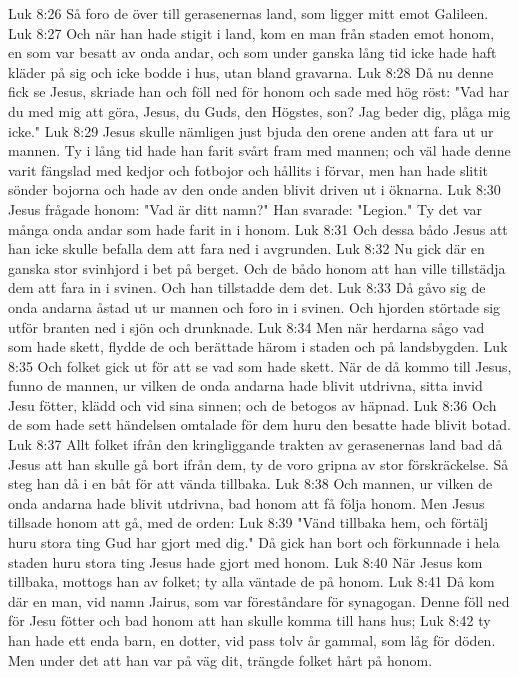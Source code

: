 Luk 8:26  Så foro de över till gerasenernas land, som ligger mitt emot Galileen.
Luk 8:27  Och när han hade stigit i land, kom en man från staden emot honom, en som var besatt av onda andar, och som under ganska lång tid icke hade haft kläder på sig och icke bodde i hus, utan bland gravarna.
Luk 8:28  Då nu denne fick se Jesus, skriade han och föll ned för honom och sade med hög röst: "Vad har du med mig att göra, Jesus, du Guds, den Högstes, son? Jag beder dig, plåga mig icke."
Luk 8:29  Jesus skulle nämligen just bjuda den orene anden att fara ut ur mannen. Ty i lång tid hade han farit svårt fram med mannen; och väl hade denne varit fängslad med kedjor och fotbojor och hållits i förvar, men han hade slitit sönder bojorna och hade av den onde anden blivit driven ut i öknarna.
Luk 8:30  Jesus frågade honom: "Vad är ditt namn?" Han svarade: "Legion." Ty det var många onda andar som hade farit in i honom.
Luk 8:31  Och dessa bådo Jesus att han icke skulle befalla dem att fara ned i avgrunden.
Luk 8:32  Nu gick där en ganska stor svinhjord i bet på berget. Och de bådo honom att han ville tillstädja dem att fara in i svinen. Och han tillstadde dem det.
Luk 8:33  Då gåvo sig de onda andarna åstad ut ur mannen och foro in i svinen. Och hjorden störtade sig utför branten ned i sjön och drunknade.
Luk 8:34  Men när herdarna sågo vad som hade skett, flydde de och berättade härom i staden och på landsbygden.
Luk 8:35  Och folket gick ut för att se vad som hade skett. När de då kommo till Jesus, funno de mannen, ur vilken de onda andarna hade blivit utdrivna, sitta invid Jesu fötter, klädd och vid sina sinnen; och de betogos av häpnad.
Luk 8:36  Och de som hade sett händelsen omtalade för dem huru den besatte hade blivit botad.
Luk 8:37  Allt folket ifrån den kringliggande trakten av gerasenernas land bad då Jesus att han skulle gå bort ifrån dem, ty de voro gripna av stor förskräckelse. Så steg han då i en båt för att vända tillbaka.
Luk 8:38  Och mannen, ur vilken de onda andarna hade blivit utdrivna, bad honom att få följa honom. Men Jesus tillsade honom att gå, med de orden:
Luk 8:39  "Vänd tillbaka hem, och förtälj huru stora ting Gud har gjort med dig." Då gick han bort och förkunnade i hela staden huru stora ting Jesus hade gjort med honom.
Luk 8:40  När Jesus kom tillbaka, mottogs han av folket; ty alla väntade de på honom.
Luk 8:41  Då kom där en man, vid namn Jairus, som var föreståndare för synagogan. Denne föll ned för Jesu fötter och bad honom att han skulle komma till hans hus;
Luk 8:42  ty han hade ett enda barn, en dotter, vid pass tolv år gammal, som låg för döden. Men under det att han var på väg dit, trängde folket hårt på honom.
